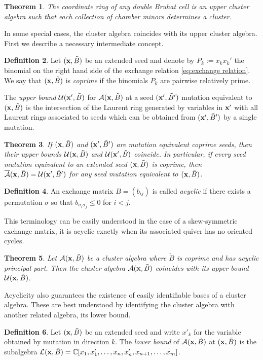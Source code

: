 \documentclass{amsart}
\newtheorem{theorem}{Theorem}[section]
\theoremstyle{definition}
\newtheorem{definition}[theorem]{Definition}
\theoremstyle{remark}
\numberwithin{equation}{section}
\newcommand{\cA}{{\mathcal{A}}}
\newcommand{\cL}{{\mathcal{L}}}
\newcommand{\cU}{{\mathcal{U}}}
\newcommand{\x}{{\bf x}}
\newcommand{\bx}{{\bf x}}
\newcommand{\CC}{{\mathbb{C}}}
\begin{document}
  \begin{theorem}\cite{BFZ05}
    The coordinate ring of any double Bruhat cell is an upper cluster algebra such that each collection of chamber minors determines a cluster.
  \end{theorem}

  In some special cases, the cluster algebra coincides with its upper cluster algebra.  First we describe a necessary intermediate concept.
  \begin{definition}\label{def:coprime}
    Let $(\bx,\tilde B)$ be an extended seed and denote by $P_k:=x_kx_k'$ the binomial on the right hand side of the exchange relation \eqref{eq:exchange relation}.  We say that $(\bx,\tilde B)$ is \emph{coprime} if the binomials $P_k$ are pairwise relatively prime.
  \end{definition}
  The \emph{upper bound} $\cU(\bx',\tilde B)$ for $\cA(\bx,\tilde B)$ at a seed $(\bx',\tilde B')$ mutation equivalent to $(\bx,\tilde B)$ is the intersection of the Laurent ring generated by variables in $\bx'$ with all Laurent rings associated to seeds which can be obtained from $(\bx',\tilde B')$ by a single mutation.
  \begin{theorem}\cite{BFZ05}
    If $(\bx,\tilde B)$ and $(\bx',\tilde B')$ are mutation equivalent coprime seeds, then their upper bounds $\cU(\bx,\tilde B)$ and $\cU(\bx',\tilde B)$ coincide.  In particular, if every seed mutation equivalent to an extended seed $(\bx,\tilde B)$ is coprime, then $\overline{\cA}(\bx,\tilde B)=\cU(\bx',\tilde B')$ for any seed mutation equivalent to $(\bx,\tilde B)$.
  \end{theorem}

  \begin{definition}
    An exchange matrix $B=(b_{ij})$ is called \emph{acyclic} if there exists a permutation $\sigma$ so that $b_{\sigma_i\sigma_j}\le 0$ for $i<j$.
  \end{definition}
  This terminology can be easily understood in the case of a skew-symmetric exchange matrix, it is acyclic exactly when its associated quiver has no oriented cycles.
  \begin{theorem}\cite{BFZ05}\label{th:acyclic upper bounds}
    Let $\cA(\x,\tilde B)$ be a cluster algebra where $\tilde B$ is coprime and has acyclic principal part.  Then the cluster algebra $\cA(\x,\tilde B)$ coincides with its upper bound $\cU(\x,\tilde B)$.
  \end{theorem}

  Acyclicity also guarantees the existence of easily identifiable bases of a cluster algebra.  These are best understood by identifying the cluster algebra with another related algebra, its lower bound.
  \begin{definition}
    Let $(\x,\tilde B)$ be an extended seed and write $x'_k$ for the variable obtained by mutation in direction $k$.  The \emph{lower bound} of $\cA(\x,\tilde B)$ at $(\x,\tilde B)$ is the subalgebra $\cL(\x,\tilde B)=\CC[x_1,x'_1,\ldots,x_n,x'_n,x_{n+1},\ldots,x_m]$.
  \end{definition}
\end{document}
